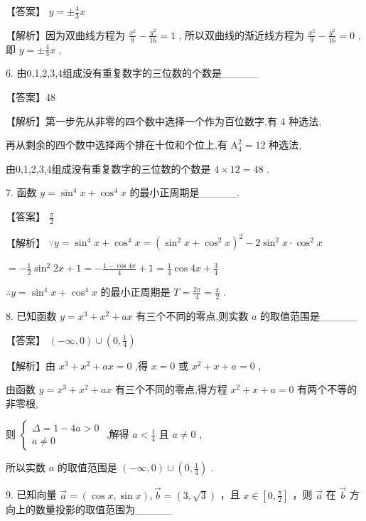 \documentclass[10pt]{article}
\begin{document}
【答案】 \(y =  \pm  \frac{4}{3}x\)

【解析】因为双曲线方程为 \(\frac{{x}^{2}}{9} - \frac{{y}^{2}}{16} = 1\) , 所以双曲线的渐近线方程为 \(\frac{{x}^{2}}{9} - \frac{{y}^{2}}{16} = 0\) ,即 \(y =  \pm  \frac{4}{3}x\) ,

6. 由0,1,2,3,4组成没有重复数字的三位数的个数是\_\_\_\_\_

【答案】48

【解析】第一步先从非零的四个数中选择一个作为百位数字,有 4 种选法,

再从剩余的四个数中选择两个排在十位和个位上,有 \({\mathrm{A}}_{4}^{2} = {12}\) 种选法,

由0,1,2,3,4组成没有重复数字的三位数的个数是 \(4 \times  {12} = {48}\) .

7. 函数 \(y = {\sin }^{4}x + {\cos }^{4}x\) 的最小正周期是\_\_\_\_\_.

【答案】 \(\frac{\pi }{2}\)

【解析】 \(\because y = {\sin }^{4}x + {\cos }^{4}x = {\left( {\sin }^{2}x + {\cos }^{2}x\right) }^{2} - 2{\sin }^{2}x \cdot  {\cos }^{2}x\)

\(=  - \frac{1}{2}{\sin }^{2}{2x} + 1 =  - \frac{1 - \cos {4x}}{4} + 1 = \frac{1}{4}\cos {4x} + \frac{3}{4}\)

\(\therefore y = {\sin }^{4}x + {\cos }^{4}x\) 的最小正周期是 \(T = \frac{2\pi }{4} = \frac{\pi }{2}\) .

8. 已知函数 \(y = {x}^{3} + {x}^{2} + {ax}\) 有三个不同的零点,则实数 \(a\) 的取值范围是\_\_\_\_\_

【答案】 \(\left( {-\infty ,0}\right)  \cup  \left( {0,\frac{1}{4}}\right)\)

【解析】由 \({x}^{3} + {x}^{2} + {ax} = 0\) ,得 \(x = 0\) 或 \({x}^{2} + x + a = 0\) ,

由函数 \(y = {x}^{3} + {x}^{2} + {ax}\) 有三个不同的零点,得方程 \({x}^{2} + x + a = 0\) 有两个不等的非零根,

则 \(\left\{  \begin{array}{l} \Delta  = 1 - {4a} > 0 \\  a \neq  0 \end{array}\right.\) ,解得 \(a < \frac{1}{4}\) 且 \(a \neq  0\) ,

所以实数 \(a\) 的取值范围是 \(\left( {-\infty ,0}\right)  \cup  \left( {0,\frac{1}{4}}\right)\) .

9. 已知向量 \(\overrightarrow{a} = \left( {\cos x,\sin x}\right) ,\overrightarrow{b} = \left( {3,\sqrt{3}}\right)\) ，且 \(x \in  \left\lbrack  {0,\frac{\pi }{2}}\right\rbrack\) ，则 \(\overrightarrow{a}\) 在 \(\overrightarrow{b}\) 方向上的数量投影的取值范围为\_\_\_\_\_
\end{document}
